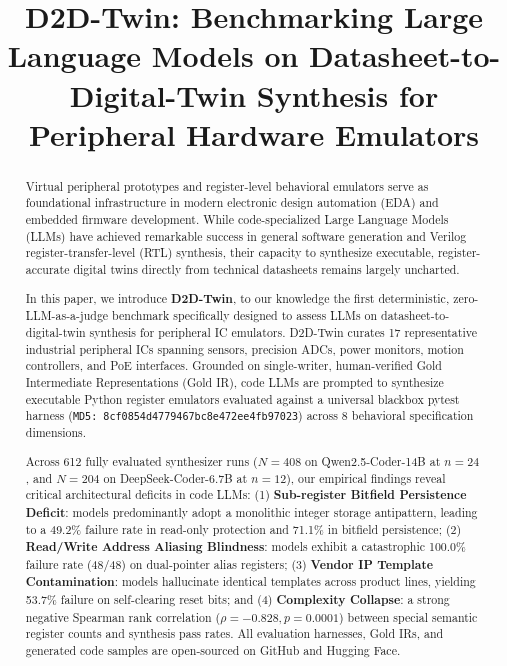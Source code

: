 \documentclass[conference]{IEEEtran}
\begin{document}
\title{D2D-Twin: Benchmarking Large Language Models on Datasheet-to-Digital-Twin Synthesis for Peripheral Hardware Emulators}

\author{
}

\maketitle

\begin{abstract}
Virtual peripheral prototypes and register-level behavioral emulators serve as foundational infrastructure in modern electronic design automation (EDA) and embedded firmware development. While code-specialized Large Language Models (LLMs) have achieved remarkable success in general software generation and Verilog register-transfer-level (RTL) synthesis, their capacity to synthesize executable, register-accurate digital twins directly from technical datasheets remains largely uncharted. 

In this paper, we introduce \textbf{D2D-Twin}, to our knowledge the first deterministic, zero-LLM-as-a-judge benchmark specifically designed to assess LLMs on datasheet-to-digital-twin synthesis for peripheral IC emulators. D2D-Twin curates 17 representative industrial peripheral ICs spanning sensors, precision ADCs, power monitors, motion controllers, and PoE interfaces. Grounded on single-writer, human-verified Gold Intermediate Representations (Gold IR), code LLMs are prompted to synthesize executable Python register emulators evaluated against a universal blackbox pytest harness (\texttt{MD5: 8cf0854d4779467bc8e472ee4fb97023}) across 8 behavioral specification dimensions.

Across 612 fully evaluated synthesizer runs ($N=408$ on Qwen2.5-Coder-14B at $n=24$, and $N=204$ on DeepSeek-Coder-6.7B at $n=12$), our empirical findings reveal critical architectural deficits in code LLMs: 
(1) \textbf{Sub-register Bitfield Persistence Deficit}: models predominantly adopt a monolithic integer storage antipattern, leading to a 49.2\% failure rate in read-only protection and 71.1\% in bitfield persistence; 
(2) \textbf{Read/Write Address Aliasing Blindness}: models exhibit a catastrophic 100.0\% failure rate (48/48) on dual-pointer alias registers; 
(3) \textbf{Vendor IP Template Contamination}: models hallucinate identical templates across product lines, yielding 53.7\% failure on self-clearing reset bits; and 
(4) \textbf{Complexity Collapse}: a strong negative Spearman rank correlation ($\rho = -0.828, p = 0.0001$) between special semantic register counts and synthesis pass rates.
All evaluation harnesses, Gold IRs, and generated code samples are open-sourced on GitHub and Hugging Face.
\end{abstract}
\end{document}
